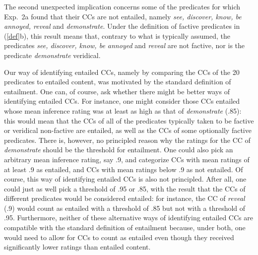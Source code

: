 \documentclass[11pt,fleqn]{article}
\newcommand{\6}{\mbox{$[\hspace*{-.6mm}[$}}
\newcommand{\9}{\mbox{$]\hspace*{-.6mm}]$}}
\begin{document}
The second unexpected implication concerns some of the predicates for which Exp.~2a found that their CCs are not entailed, namely {\em see, discover, know, be annoyed, reveal} and {\em demonstrate}. Under the definition of factive predicates in (\ref{def}b), this result means that, contrary to what is typically assumed, the predicates {\em see, discover, know, be annoyed} and {\em reveal} are not factive, nor is the predicate {\em demonstrate} veridical.

Our way of identifying entailed CCs, namely by comparing the CCs of the 20 predicates to entailed content, was motivated by the standard definition of entailment. One can, of course, ask whether there might be better ways of identifying entailed CCs. For instance, one might consider those CCs entailed whose mean inference rating was at least as high as that of {\em demonstrate} (.85): this would mean that the CCs of all of the predicates typically taken to be factive or veridical non-factive are entailed, as well as the CCs of some optionally factive predicates. There is, however, no principled reason why the ratings for the CC of {\em demonstrate} should be the threshold for entailment. One could also pick an arbitrary mean inference rating, say .9, and categorize CCs with mean ratings of at least .9 as entailed, and CCs with mean ratings below .9 as not entailed. Of course, this way of identifying entailed CCs is also not principled. After all, one could just as well pick a threshold of .95 or .85, with the result that the CCs of different predicates would be considered entailed: for instance, the CC of {\em reveal} (.9) would count as entailed with a threshold of .85 but not with a threshold of .95. Furthermore, neither of these alternative ways of identifying entailed CCs are compatible with the standard definition of entailment because, under both, one would need to allow for CCs to count as entailed even though they received significantly lower ratings than entailed content.

\end{document}

